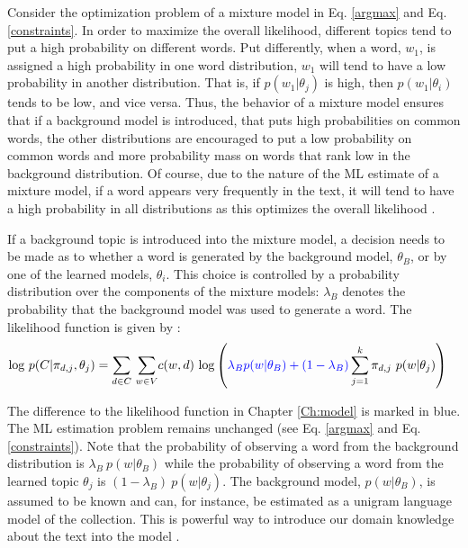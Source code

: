 \documentclass[11pt,a4paper,english,oneside]{book}
\numberwithin{equation}{chapter}
\begin{document}
Consider the optimization problem of a mixture model in Eq. \ref{argmax} and Eq. \ref{constraints}. In order to maximize the overall likelihood, different topics tend to put a high probability on different words. Put differently, when a word, $w_1$, is assigned a high probability in one word distribution, $w_1$ will tend to have a low probability in another distribution. That is, if $p(w_1|\theta_j)$ is high, then $p(w_1|\theta_i)$ tends to be low, and vice versa. Thus, the behavior of a mixture model ensures that if a background model is introduced, that puts high probabilities on common words, the other distributions are encouraged to put a low probability on common words and more probability mass on words that rank low in the background distribution. Of course, due to the nature of the ML estimate of a mixture model, if a word appears very frequently in the text, it will tend to have a high probability in all distributions as this optimizes the overall likelihood \citep[p. 353--359]{Zhai.2016}.

If a background topic is introduced into the mixture model, a decision needs to be made as to whether a word is generated by the background model, $\theta_B$, or by one of the learned models, $\theta_i$. This choice is controlled by a probability distribution over the components of the mixture models: $\lambda_B$ denotes the probability that the background model was used to generate a word. The likelihood function is given by \citep[p. 372]{Zhai.2016}:
\begin{align}
\label{BLL} \text{log} \ p(C|\pi_{d,j},\theta_j) &= \underset{d \in C}{\sum} \ \underset{w \in V}\sum c(w,d) \ \text{log} \left( \textcolor{blue}{\lambda_B p(w|\theta_B) + (1-\lambda_B)} \sum_{j=1}^{k}\pi_{d,j} \ p(w|\theta_j) \right)
\end{align}

The difference to the likelihood function in Chapter \ref{Ch:model} is marked in blue. The ML estimation problem remains unchanged (see Eq. \ref{argmax} and Eq. \ref{constraints}). Note that the probability of observing a word from the background distribution is $\lambda_B \ p(w|\theta_B)$ while the probability of observing a word from the learned topic $\theta_j$ is $(1-\lambda_B) \ p(w|\theta_j)$. The background model, $p(w|\theta_B)$, is assumed to be known and can, for instance, be estimated as a unigram language model of the collection. This is powerful way to introduce our domain knowledge about the text into the model \citep[p. 352, 372--376]{Zhai.2016}. 
\end{document}
